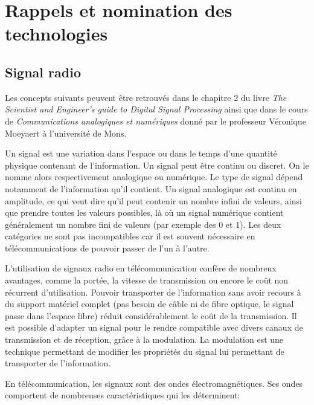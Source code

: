 \renewcommand{\leftmark}{NOMINATION DES TECHNOLOGIES}


\chapter{Rappels et nomination des technologies}\label{chap1}

\section{Signal radio}

Les concepts suivants peuvent être retrouvés dans le chapitre 2 du livre \textit{The Scientist and Engineer's guide to Digital Signal Processing} \cite{book2} ainsi que dans le cours de \textit{Communications analogiques et numériques} donné par le professeur Véronique Moeyaert à l'université de Mons.

\vspace{0.1cm}

Un signal est une variation dans l'espace ou dans le temps d'une quantité physique contenant de l'information. Un signal peut être continu ou discret. On le nomme alors respectivement analogique ou numérique. Le type de signal dépend notamment de l'information qu'il contient. Un signal analogique est continu en amplitude, ce qui veut dire qu'il peut contenir un nombre infini de valeurs, ainsi que prendre toutes les valeurs possibles, là où un signal numérique contient généra\-lement un nombre fini de valeurs (par exemple des 0 et 1).
Les deux catégories ne sont pas incompatibles car il est souvent nécessaire en télécommunications de pouvoir passer de l'un à l'autre.

\vspace{0.1cm}

L'utilisation de signaux radio en télécommunication confère de nombreux avantages, comme la portée, la vitesse de transmission  ou encore le coût non récurrent d'utilisation. Pouvoir transporter de l'information sans avoir recours à du support matériel complet (pas besoin de câble ni de fibre optique, le signal passe dans l'espace libre) réduit considérablement le coût de la transmission. Il est possible d'adapter un signal pour le rendre compatible avec divers canaux de transmission et de réception, grâce à la modulation. La modulation est une technique permettant de modifier les propriétés du signal lui permettant de transporter de l'information.

\newpage

En télécommunication, les signaux sont des ondes électromagnétiques. Ses ondes comportent de nombreuses caractéristiques qui les déterminent: 

